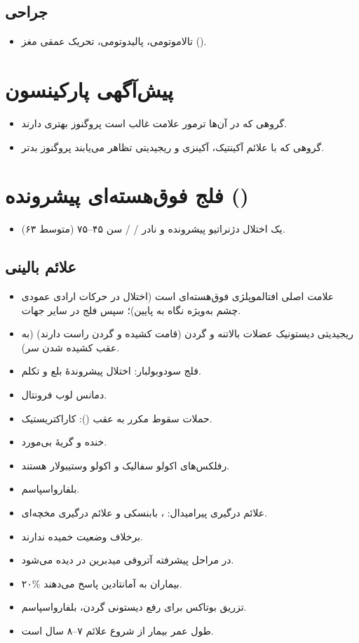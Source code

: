 \documentclass[a4paper,12pt]{extbook}
\begin{document}
\subsection*{جراحی}
\begin{itemize}
\item تالاموتومی، پالیدوتومی، تحریک عمقی مغز ().
\end{itemize}

\section*{پیش‌آگهی پارکینسون}
\begin{itemize}
\item گروهی که در آن‌ها ترمور علامت غالب است پروگنوز بهتری دارند.
\item گروهی که با علائم آکینتیک، آکینزی و ریجیدیتی تظاهر می‌یابند پروگنوز بدتر.
\end{itemize}
\section*{فلج فوق‌هسته‌ای پیشرونده ()}
\begin{itemize}
\item یک اختلال دژنراتیو پیشرونده و نادر /  / سن ۴۵–۷۵ (متوسط ۶۳).
\end{itemize}
\subsection*{علائم بالینی}
\begin{itemize}
\item علامت اصلی افتالموپلژی فوق‌هسته‌ای است (اختلال در حرکات ارادی عمودی چشم به‌ویژه نگاه به پایین)؛ سپس فلج  در سایر جهات.
\item ریجیدیتی دیستونیک عضلات بالاتنه و گردن (قامت کشیده و گردن راست دارند) (به عقب کشیده شدن سر).
\item فلج سودوبولبار: اختلال پیشروندهٔ بلع و تکلم.
\item دمانس لوب فرونتال.
\item حملات سقوط مکرر به عقب (): کاراکتریستیک.
\item خنده و گریهٔ بی‌مورد.
\item رفلکس‌های اکولو سفالیک و اکولو وستیبولار  هستند.
\item بلفارواسپاسم.
\item علائم درگیری پیرامیدال: ، بابنسکی  و علائم درگیری مخچه‌ای.
\item برخلاف  وضعیت خمیده ندارند.
\item در مراحل پیشرفته آتروفی میدبرین در  دیده می‌شود.
\item ۲۰\% بیماران به آمانتادین پاسخ می‌دهند.
\item تزریق بوتاکس برای رفع دیستونی گردن، بلفارواسپاسم.
\item طول عمر بیمار از شروع علائم ۷–۸ سال است.
\end{itemize}
\end{document}

